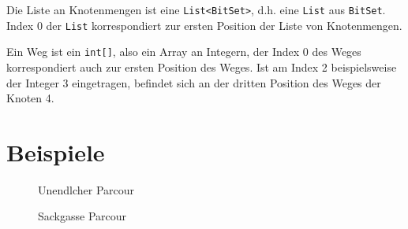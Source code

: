 \documentclass[a4paper,10pt,ngerman]{scrartcl}
\begin{document}
	Die Liste an Knotenmengen ist eine \texttt{List<BitSet>},
	d.h. eine \texttt{List} aus \texttt{BitSet}.
	Index 0 der \texttt{List} korrespondiert zur ersten Position der Liste von Knotenmengen.
	
	Ein Weg ist ein \texttt{int[]}, also ein Array an Integern,
	der Index 0 des Weges korrespondiert auch zur ersten Position des Weges.
	Ist am Index 2 beispielsweise der Integer 3 eingetragen,
	befindet sich an der dritten Position des Weges der Knoten 4.


    \section{Beispiele}\label{sec:beispiele}

    \begin{figure}[htb]
        \centering
        \IL{}
        \caption{Unendlcher Parcour}
        \label{fig:Figure3}
    \end{figure}

    \begin{figure}[htb]
        \centering
        \IL{}
        \caption{Sackgasse Parcour}
        \label{fig:Figure4}
    \end{figure}
\end{document}
